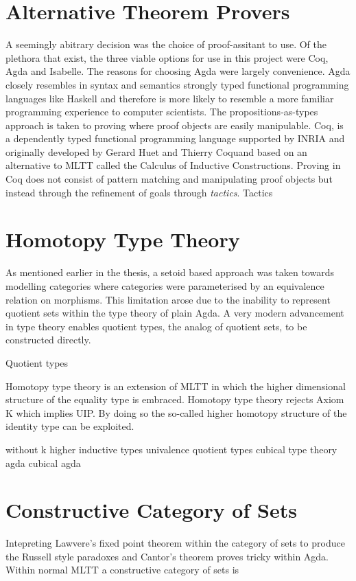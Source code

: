 \section{Alternative Theorem Provers}
A seemingly abitrary decision was the choice of proof-assitant to use. Of the
plethora that exist, the three viable options for use in this project were Coq,
Agda and Isabelle. The reasons for choosing Agda were largely convenience. Agda
closely resembles in syntax and semantics strongly typed functional programming
languages like Haskell and therefore is more likely to resemble a more familiar
programming experience to computer scientists. The propositions-as-types
approach is taken to proving where proof objects are easily manipulable. Coq, is
a dependently typed functional programming language supported by INRIA and
originally developed by Gerard Huet and Thierry Coquand based on an alternative
to MLTT called the Calculus of Inductive Constructions. Proving in Coq does not
consist of pattern matching and manipulating proof objects but instead through
the refinement of goals through \textit{tactics}. Tactics 
\section{Homotopy Type Theory}
As mentioned earlier in the thesis, a setoid based approach was taken towards
modelling categories where categories were parameterised by an equivalence
relation on morphisms. This limitation arose due to the inability to represent
quotient sets within the type theory of plain Agda. A very modern advancement in
type theory enables quotient types, the analog of quotient sets, to be
constructed directly.

Quotient types

Homotopy type theory is an extension of MLTT in which the
higher dimensional structure of the equality type is embraced. Homotopy type
theory rejects Axiom K which implies UIP. By doing so the so-called higher
homotopy structure of the identity type can be exploited.

without k
higher inductive types
univalence
quotient types
cubical type theory agda
cubical agda

\section{Constructive Category of Sets}
Intepreting Lawvere's fixed point theorem within the category of sets to
produce the Russell style paradoxes and Cantor's theorem proves tricky within
Agda. Within normal MLTT a constructive category of sets is

